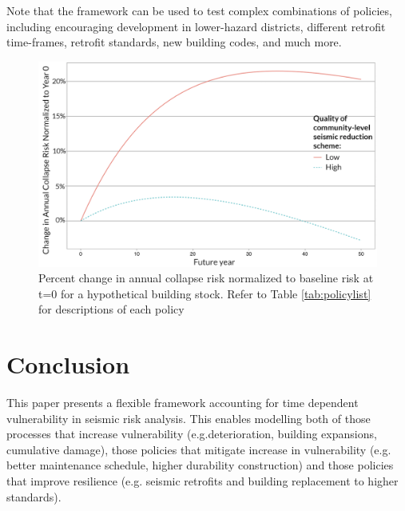 Note that the framework can be used to test complex combinations of policies, including encouraging development in lower-hazard districts, different retrofit time-frames, retrofit standards, new building codes, and much more.

\begin{figure}[htbp!]
  \centering
  \includegraphics[width=\linewidth]{Figures/community_level.png}
  \caption{Percent change in annual collapse risk normalized to baseline risk at t=0 for a hypothetical building stock. Refer to Table \ref{tab:policylist} for descriptions of each policy }
  \label{fig:commlevel}
\end{figure} 



\section{Conclusion}

This paper presents a flexible framework accounting for time dependent vulnerability in seismic risk analysis. 
This enables modelling both of those processes that increase vulnerability (e.g.deterioration, building expansions, cumulative damage), those policies that mitigate increase in vulnerability (e.g. better maintenance schedule, higher durability construction) and those policies that improve resilience (e.g. seismic retrofits and building replacement to higher standards).

